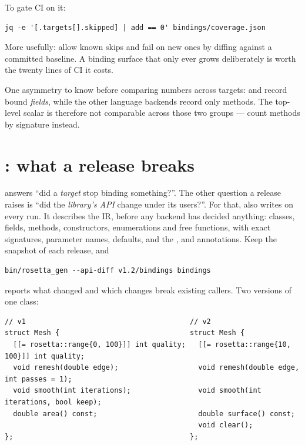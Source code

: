 To gate CI on it:

\begin{lstlisting}[style=sh]
jq -e '[.targets[].skipped] | add == 0' bindings/coverage.json
\end{lstlisting}

More usefully: allow known skips and fail on new ones by diffing against a
committed baseline. A binding surface that only ever grows deliberately is worth
the twenty lines of CI it costs.

\begin{warn}
One asymmetry to know before comparing numbers across targets:
 and  record bound \emph{fields}, while the other
language backends record only methods. The top-level  scalar is
therefore not comparable across those two groups --- count methods by signature
instead.
\end{warn}

\section{: what a release breaks}
\label{sec:api-diff}

 answers ``did a \emph{target} stop binding something?''.
The other question a release raises is ``did the \emph{library's API} change
under its users?''. For that,  also writes
 on every run. It describes the IR, before any
backend has decided anything: classes, fields, methods, constructors,
enumerations and free functions, with exact signatures, parameter names,
defaults, and the ,  and 
annotations. Keep the snapshot of each release, and

\begin{lstlisting}[style=sh]
bin/rosetta_gen --api-diff v1.2/bindings bindings
\end{lstlisting}

reports what changed and which changes break existing callers. Two versions of
one class:

\begin{lstlisting}[style=cpp]
// v1                                       // v2
struct Mesh {                               struct Mesh {
  [[= rosetta::range{0, 100}]] int quality;   [[= rosetta::range{10, 100}]] int quality;
  void remesh(double edge);                   void remesh(double edge, int passes = 1);
  void smooth(int iterations);                void smooth(int iterations, bool keep);
  double area() const;                        double surface() const;
                                              void clear();
};                                          };
\end{lstlisting}

